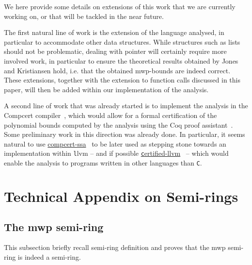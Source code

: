 \documentclass[runningheads]{llncs}
\makeatletter
\newcommand*{\ie}{i.e.\@\xspace}
\makeatother
\begin{document}
We here provide some details on extensions of this work that we are currently working on, or that will be tackled in the near future.

The first natural line of work is the extension of the language analysed, in particular to accommodate other data structures.
While structures such as lists should not be problematic, dealing with pointer will certainly require more involved work, in particular to ensure the theoretical results obtained by Jones and Kristiansen hold, \ie that the obtained mwp-bounds are indeed correct. These extensions, together with the extension to function calls discussed in this paper, will then be added within our implementation of the analysis.

A second line of work that was already started is to implement the analysis in the Compcert compiler~\cite{Leroy2009}, which would allow for a formal certification of the polynomial bounds computed by the analysis using the Coq proof assistant~\cite{coqman}.
Some preliminary work in this direction was already done. In particular, it seems natural to use \href{https://compcertssa.gitlabpages.inria.fr}{\sc compcert-ssa}~\cite{Barthe2014} to be later used as stepping stone towards an implementation within {\texttt llvm} -- and if possible \href{https://www.cis.upenn.edu/~stevez/vellvm/}{\texttt certified-llvm}~\cite{Zhao2013} -- which would enable the analysis to programs written in other languages than {\texttt C}.




\appendix
\section{Technical Appendix on Semi-rings}
\label{app:sec:semi-ring}

\subsection{The mwp semi-ring}
\label{sec:app:mwp}

This subsection briefly recall semi-ring definition and proves that the mwp semi-ring is indeed a semi-ring.
\end{document}
